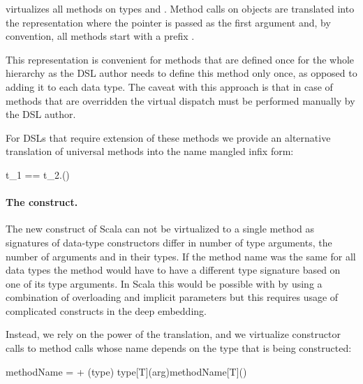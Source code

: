  \yy virtualizes all methods on types  and . Method calls on objects
  are translated into the representation where the  pointer is passed as the first argument and, by convention, all methods start
  with a prefix .

  This representation is convenient for methods that are defined once for the whole hierarchy as
  the DSL author needs to define this method only once, as opposed to adding it to each data type. The caveat with
  this approach is that in case of methods that are overridden the virtual dispatch must be
  performed manually by the DSL author.

  For DSLs that require extension of these methods we provide an alternative translation
  of universal methods into the name mangled infix form:%

  \infyyax{}
      {t_1\; == \;t_2}{.\;\mathtt{\$==}(\;)}

  \paragraph{The  construct.} The new construct of Scala can not be
  virtualized to a single method as signatures of data-type constructors differ in number
   of type arguments, the number of arguments and in their types. If the method name was the
   same for all data types the method would have to have a different type signature based on
   one of its type arguments. In Scala this would be possible with by using a combination of
   overloading and implicit parameters but this requires usage of complicated constructs in the deep embedding.


   Instead, we rely on the power of the translation, and we virtualize constructor calls
     to method calls whose name depends on the type that is being constructed:

  \infyy{}
      {\tctx{\Gamma} methodName =  + (type)}
      { \; type[T](arg)}{methodName[T]()}

